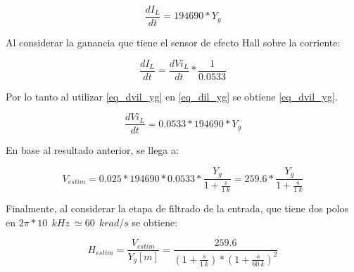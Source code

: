 \begin{equation} \label{eq_dil_yg}
	\frac{dI_{L}}{dt} = 194690 * Y_{g}
\end{equation}


Al considerar la ganancia que tiene el sensor de efecto Hall sobre la corriente:

\begin{equation} \label{eq_dil_dvil}
	\frac{dI_{L}}{dt} =\frac{dVi_{L}}{dt}*\frac{1}{0.0533}
\end{equation}

Por lo tanto al utilizar \ref{eq_dvil_yg} en \ref{eq_dil_yg} se obtiene \ref{eq_dvil_yg}.

\begin{equation} \label{eq_dvil_yg}
	\frac{dVi_{L}}{dt} = 0.0533*194690*Y_{g}
\end{equation}


En base al resultado anterior, se llega a:



\begin{equation}
	V_{estim}=0.025*194690*0.0533 * \frac{Y_{g}}{1 + \frac{s}{1\:k}}=259.6*\frac{Y_{g}}{1 + \frac{s}{1\:k}}	
\end{equation}

Finalmente, al considerar la etapa de filtrado de la entrada, que tiene dos polos en $2\pi *10\: \:{kHz}\ \simeq 60\: \:{krad/s}$ se obtiene:

\begin{equation} \label{eq_TLC_deriv_7}
	H_{estim}=\frac{V_{estim}}{Y_{g}[m]}=\frac{259.6}{(1+\frac{s}{1\:k})*{(1+\frac{s}{60\: k})}^2}
\end{equation}

